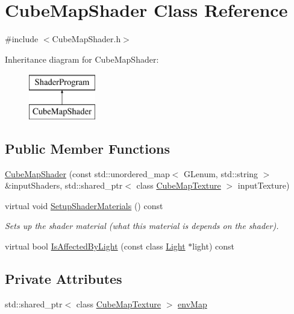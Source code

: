 \hypertarget{class_cube_map_shader}{}\section{Cube\+Map\+Shader Class Reference}
\label{class_cube_map_shader}


{\ttfamily \#include $<$Cube\+Map\+Shader.\+h$>$}

Inheritance diagram for Cube\+Map\+Shader\+:\begin{figure}[H]
\begin{center}
\leavevmode
\includegraphics[height=2.000000cm]{class_cube_map_shader}
\end{center}
\end{figure}
\subsection*{Public Member Functions}
\begin{DoxyCompactItemize}
\item
\hyperlink{class_cube_map_shader_abfd5fb870087965ef8d37323f7f9ed3a}{Cube\+Map\+Shader} (const std\+::unordered\+\_\+map$<$ G\+Lenum, std\+::string $>$ \&input\+Shaders, std\+::shared\+\_\+ptr$<$ class \hyperlink{class_cube_map_texture}{Cube\+Map\+Texture} $>$ input\+Texture)
\item
virtual void \hyperlink{class_cube_map_shader_a9deaf42646258af9237751f331fb215a}{Setup\+Shader\+Materials} () const
\begin{DoxyCompactList}\small\item\em Sets up the shader material (what this material is depends on the shader). \end{DoxyCompactList}\item
virtual bool \hyperlink{class_cube_map_shader_aa0c9e535cb18663acd9857165abc788f}{Is\+Affected\+By\+Light} (const class \hyperlink{class_light}{Light} $\ast$light) const
\end{DoxyCompactItemize}
\subsection*{Private Attributes}
\begin{DoxyCompactItemize}
\item
std\+::shared\+\_\+ptr$<$ class \hyperlink{class_cube_map_texture}{Cube\+Map\+Texture} $>$ \hyperlink{class_cube_map_shader_ab9ea944d2b14c6a47406e36d9046caa6}{env\+Map}
\end{DoxyCompactItemize}
